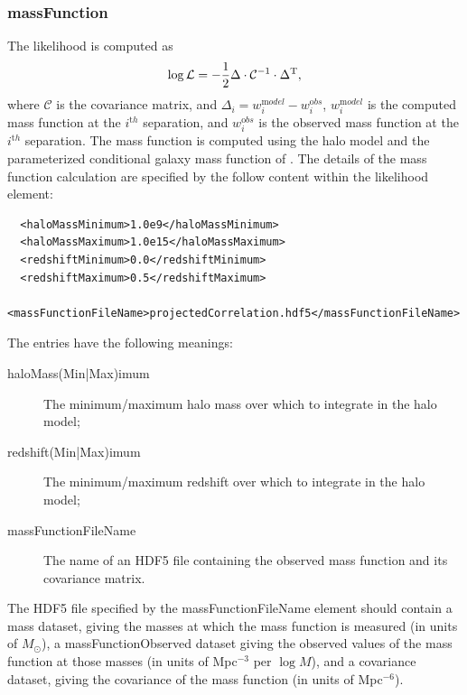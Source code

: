\subsubsection{massFunction}

The likelihood is computed as
\begin{equation}
\log \mathcal{L} = -{1\over2} \Delta \cdot \mathcal{C}^{-1} \cdot \Delta^{\mathrm T},
\end{equation}
where $\mathcal{C}$ is the covariance matrix, and $\Delta_i = w_i^{\mathrm model} - w_i^{\mathrm obs}$, $w_i^{\mathrm model}$ is the computed mass function at the $i^{\mathrm th}$ separation, and $w_i^{\mathrm obs}$ is the observed mass function at the $i^{\mathrm th}$ separation. The mass function is computed using the halo model and the parameterized conditional galaxy mass function of \cite[][see also \protect\cite{leauthaud_new_2011}; \S\protect\ref{phys:conditionalMassFunction:conditionalMassFunctionBehroozi2010}]{behroozi_comprehensive_2010}. The details of the mass function calculation are specified by the follow content within the {\normalfont \ttfamily likelihood} element:
\begin{verbatim}
  <haloMassMinimum>1.0e9</haloMassMinimum>
  <haloMassMaximum>1.0e15</haloMassMaximum>
  <redshiftMinimum>0.0</redshiftMinimum>
  <redshiftMaximum>0.5</redshiftMaximum>
  <massFunctionFileName>projectedCorrelation.hdf5</massFunctionFileName>
\end{verbatim}

The entries have the following meanings:
\begin{description}
\item[{\normalfont \ttfamily haloMass(Min|Max)imum}] The minimum/maximum halo mass over which to integrate in the halo model;
\item[{\normalfont \ttfamily redshift(Min|Max)imum}] The minimum/maximum redshift over which to integrate in the halo model;
\item[{\normalfont \ttfamily massFunctionFileName}] The name of an HDF5 file containing the observed mass function and its covariance matrix.
\end{description}

The HDF5 file specified by the {\normalfont \ttfamily massFunctionFileName} element should contain a {\normalfont \ttfamily mass} dataset, giving the masses at which the mass function is measured (in units of $M_\odot$), a {\normalfont \ttfamily massFunctionObserved} dataset giving the observed values of the mass function at those masses (in units of Mpc$^{-3}$ per $\log M$), and a {\normalfont \ttfamily covariance} dataset, giving the covariance of the mass function (in units of Mpc$^{-6}$).

